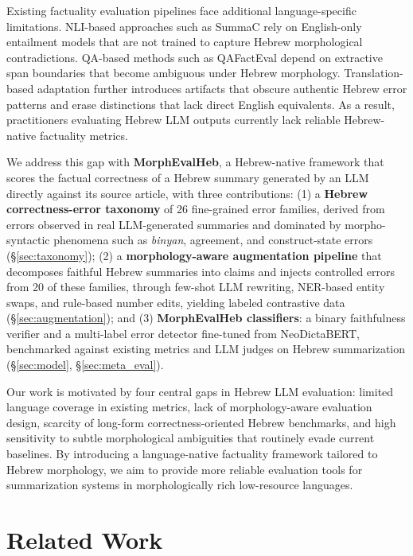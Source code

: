 \documentclass[11pt]{article}
\begin{document}
Existing factuality evaluation pipelines face additional language-specific limitations. NLI-based approaches such as SummaC rely on English-only entailment models that are not trained to capture Hebrew morphological contradictions. QA-based methods such as QAFactEval depend on extractive span boundaries that become ambiguous under Hebrew morphology. Translation-based adaptation further introduces artifacts that obscure authentic Hebrew error patterns and erase distinctions that lack direct English equivalents. As a result, practitioners evaluating Hebrew LLM outputs currently lack reliable Hebrew-native factuality metrics.

We address this gap with \textbf{MorphEvalHeb}, a Hebrew-native framework that scores the factual correctness of a Hebrew summary generated by an LLM directly against its source article, with three contributions:
(1) a \textbf{Hebrew correctness-error taxonomy} of 26 fine-grained error families, derived from errors observed in real LLM-generated summaries and dominated by morpho-syntactic phenomena such as \textit{binyan}, agreement, and construct-state errors (\S\ref{sec:taxonomy});
(2) a \textbf{morphology-aware augmentation pipeline} that decomposes faithful Hebrew summaries into claims and injects controlled errors from 20 of these families, through few-shot LLM rewriting, NER-based entity swaps, and rule-based number edits, yielding labeled contrastive data (\S\ref{sec:augmentation});
and (3) \textbf{MorphEvalHeb classifiers}: a binary faithfulness verifier and a multi-label error detector fine-tuned from NeoDictaBERT, benchmarked against existing metrics and LLM judges on Hebrew summarization (\S\ref{sec:model}, \S\ref{sec:meta_eval}).

Our work is motivated by four central gaps in Hebrew LLM evaluation: limited language coverage in existing metrics, lack of morphology-aware evaluation design, scarcity of long-form correctness-oriented Hebrew benchmarks, and high sensitivity to subtle morphological ambiguities that routinely evade current baselines. By introducing a language-native factuality framework tailored to Hebrew morphology, we aim to provide more reliable evaluation tools for summarization systems in morphologically rich low-resource languages.

\label{sec:Introduction}
\section{Related Work}\label{sec:related_work}
\end{document}
